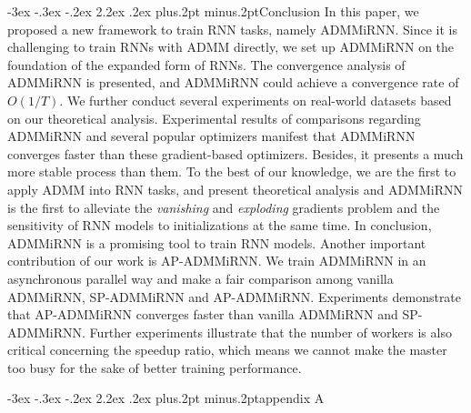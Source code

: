 \documentclass[twoside]{article}
\makeatletter
\def\section{\@startsection{section}{1}{\z@}%
 {-3ex \@plus -.3ex \@minus -.2ex}%
 {2.2ex \@plus.2ex}%
{\normalfont\normalsize\protect\baselineskip=14.5pt plus.2pt minus.2pt\bfseries}}
\makeatother
\begin{document}
\begin{multicols}{2}
\section{Conclusion}\label{sec:conclusion}
In this paper, we proposed a new framework to train RNN tasks, namely ADMMiRNN. 
Since it is challenging to train RNNs with ADMM directly, we set up ADMMiRNN on the foundation of the expanded form of RNNs. 
The convergence analysis of ADMMiRNN is presented, and ADMMiRNN could achieve a convergence rate of $O(1/T)$. 
We further conduct several experiments on real-world datasets based on our theoretical analysis. 
Experimental results of comparisons regarding ADMMiRNN and several popular optimizers manifest that ADMMiRNN converges faster than these gradient-based optimizers.
Besides, it presents a much more stable process than them.
To the best of our knowledge, we are the first to apply ADMM into RNN tasks, and present theoretical analysis and ADMMiRNN is the first to alleviate the \textit{vanishing} and \textit{exploding} gradients problem and the sensitivity of RNN models to initializations at the same time.
In conclusion, ADMMiRNN is a promising tool to train RNN models. %
Another important contribution of our work is AP-ADMMiRNN. We train ADMMiRNN in an asynchronous parallel way and make a fair comparison among vanilla ADMMiRNN, SP-ADMMiRNN and AP-ADMMiRNN. Experiments demonstrate that AP-ADMMiRNN converges faster than vanilla ADMMiRNN and SP-ADMMiRNN.
Further experiments illustrate that the number of workers is also critical concerning the speedup ratio, which means we cannot make the master too busy for the sake of better training performance.

%

\appendix
\section{appendix A}\label{appendix A}

\end{multicols}
\end{document}
